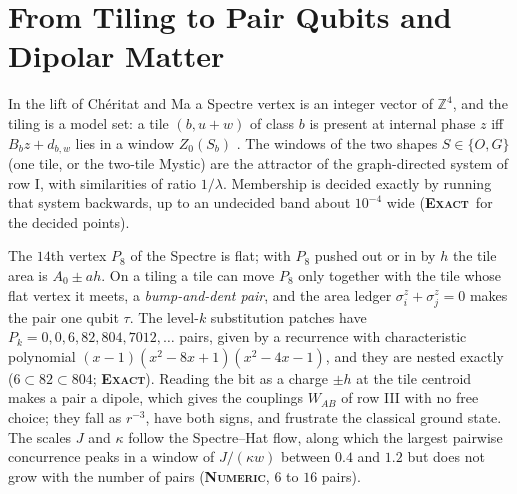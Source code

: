 \documentclass[11pt]{article}
\newcommand{\exact}{\textbf{\textsc{Exact}}}
\newcommand{\numeric}{\textbf{\textsc{Numeric}}}
\theoremstyle{definition}
\begin{document}
\section{From Tiling to Pair Qubits and Dipolar Matter}
\label{sec:substrate}
In the lift of Ch\'eritat and Ma \cite{cheritat2023} a Spectre vertex is an integer vector of $\mathbb{Z}^4$, and the tiling is a model set: a tile $(b,u{+}w)$ of class $b$ is present at internal phase $z$ iff $B_bz+d_{b,w}$ lies in a window $Z_0(S_b)$ \cite{bgms}. The windows of the two shapes $S\in\{O,G\}$ (one tile, or the two-tile Mystic) are the attractor of the graph-directed system of row I, with similarities of ratio $1/\lambda$. Membership is decided exactly by running that system backwards, up to an undecided band about $10^{-4}$ wide (\exact\ for the decided points).

The $14$th vertex $P_8$ of the Spectre is flat; with $P_8$ pushed out or in by $h$ the tile area is $A_0\pm ah$. On a tiling a tile can move $P_8$ only together with the tile whose flat vertex it meets, a \emph{bump-and-dent pair}, and the area ledger $\sigma^z_i+\sigma^z_j=0$ makes the pair one qubit $\tau$. The level-$k$ substitution patches have $P_k=0,0,6,82,804,7012,\dots$ pairs, given by a recurrence with characteristic polynomial $(x-1)(x^2-8x+1)(x^2-4x-1)$, and they are nested exactly ($6\subset82\subset804$; \exact). Reading the bit as a charge $\pm h$ at the tile centroid makes a pair a dipole, which gives the couplings $W_{AB}$ of row III with no free choice; they fall as $r^{-3}$, have both signs, and frustrate the classical ground state. The scales $J$ and $\kappa$ follow the Spectre--Hat flow, along which the largest pairwise concurrence peaks in a window of $J/(\kappa w)$ between $0.4$ and $1.2$ but does not grow with the number of pairs (\numeric, $6$ to $16$ pairs).

\end{document}
